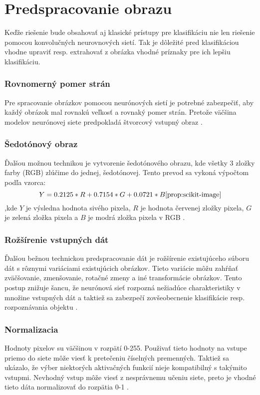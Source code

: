 
\section{Predspracovanie obrazu}
\label{sec:preprocessing}
Keďže riešenie bude obsahovať aj klasické prístupy pre klasifikáciu nie len riešenie pomocou konvolučných neurovnových sietí.
Tak je dôležité pred klasifikáciou vhodne upraviť resp. extrahovať z obrázka vhodné príznaky pre ich lepšiu klasifikáciu.

\subsubsection{Rovnomerný pomer strán}
Pre spracovanie obrázkov pomocou neurónových sietí je potrebné zabezpečiť, aby každý obrázok mal rovnakú veľkosť a rovnaký pomer strán.
Pretože väčšina modelov neurónovej siete predpokladá štvorcový vstupný obraz \cite{odkaz:NNPreprocessing}.

\subsubsection{Šedotónový obraz}
Ďalšou možnou technikou je vytvorenie šedotónového obrazu, kde všetky 3 zložky farby (RGB) zlúčime do jednej, šedotónovej.
Tento prevod sa vykoná výpočtom podľa vzorca:
\begin{equation}
    \label{eq:rgbtogray}
    Y = 0.2125*R + 0.7154*G + 0.0721*B \cite{prop:scikit-image}
\end{equation}
,kde $Y$ je výsledna hodnota sivého pixela, $R$ je hodnota červenej zložky pixela,
$G$ je zelená zložka pixela a $B$ je modrá zložka pixela v RGB \cite{odkaz:NNPreprocessing}.

\subsubsection{Rožšírenie vstupných dát}
Ďalšou bežnou technickou predspracovanie dát je rožšírenie existujúceho súboru dát s rôznymi variáciami existujúcich obrázkov.
Tieto variácie môžu zahŕňať zväčšovanie, zmenšovanie, rotačné zmeny a iné transformácie obrázkov.
Tento postup znižuje šancu, že neurónová sieť rozpozná nežiadúce charakteristiky v množine vstupných dát
	a taktiež sa zabezpečí zovšeobecnenie klasifikácie resp. rozpoznávania objektu \cite{odkaz:NNPreprocessing}.

\subsubsection{Normalizacia}
Hodnoty pixelov su väčšinou v rozpätí 0-255. Použivať tieto hodnoty na vstupe priemo do siete môže viesť k pretečeniu číselných premenných.
Taktiež sa ukázalo, že výber niektorých aktivačných funkcií nieje kompatibilný s takýmito vstupmi.
Nevhodný vstup môže viesť z nesprávnemu učeniu siete, preto je vhodné tieto dáta normalizovať do rozpätia 0-1 \cite{odkaz:PreprocessingNormalization}.

